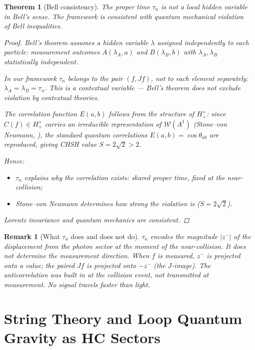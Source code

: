 \documentclass[12pt,a4paper]{article}
\newtheorem{theorem}{Theorem}[section]
\newtheorem*{remark}{Remark}
\newcommand{\zminus}{z^-}
\newcommand{\Hplusplus}{H^+_+}
\newcommand{\WA}{\mathcal{W}(A^1)}
\begin{document}
\begin{theorem}[Bell consistency]
The proper time $\tau_n$ is not a local hidden variable in Bell's sense.
The framework is consistent with quantum mechanical violation of Bell
inequalities.
\begin{proof}
Bell's theorem assumes a hidden variable $\lambda$ assigned independently
to each particle: measurement outcomes $A(\lambda_A,a)$ and
$B(\lambda_B,b)$ with $\lambda_A,\lambda_B$ statistically independent.

In our framework $\tau_n$ belongs to the pair $(f,Jf)$, not to each
element separately: $\lambda_A=\lambda_B=\tau_n$.
This is a contextual variable --- Bell's theorem does not exclude
violation by contextual theories.

The correlation function $E(a,b)$ follows from the structure of
$\Hplusplus$: since $C(f)\in\Hplusplus$ carries an irreducible
representation of $\WA$ (Stone--von Neumann, \cite{brendecke2026rh}),
the standard quantum correlations $E(a,b)=\cos\theta_{ab}$ are
reproduced, giving CHSH value $S=2\sqrt{2}>2$.

Hence:
\begin{itemize}
  \item $\tau_n$ explains why the correlation exists: shared proper time,
        fixed at the near-collision;
  \item Stone--von Neumann determines how strong the violation is
        ($S=2\sqrt{2}$).
\end{itemize}
Lorentz invariance and quantum mechanics are consistent.
\end{proof}
\end{theorem}

\begin{remark}[What $\tau_n$ does and does not do]
$\tau_n$ encodes the magnitude $|\zminus|$ of the displacement from the
photon sector at the moment of the near-collision.
It does not determine the measurement direction.
When $f$ is measured, $\zminus$ is projected onto a value; the paired
$Jf$ is projected onto $-\zminus$ (the $J$-image).
The anticorrelation was built in at the collision event, not transmitted
at measurement. No signal travels faster than light.
\end{remark}


\section{String Theory and Loop Quantum Gravity as HC Sectors}
\label{sec:stringlqg}
\end{document}
